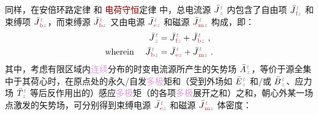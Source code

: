 同样，在安倍环路定律  和 \textcolor{Maroon}{电荷守恒}定律  中，总电流源 $\bar{J}^{\;\!\mathcolor{gray}{t}}_{\;\!\mathcolor{gray}{z}}$ 内包含了自由项 $\bar{J}^{\;\!\mathcolor{gray}{t}}_{\;\!\textcolor{Maroon}{\text{f}}\mathcolor{gray}{z}}$ 和束缚项 $\bar{J}^{\;\!\mathcolor{gray}{t}}_{\;\!\textcolor{Maroon}{\text{b}}\mathcolor{gray}{z}}$\cite{langeMultipoleTheoryHehl2015,raabMultipoleTheoryElectromagnetism2004}，而束缚源 $\bar{J}^{\;\!\mathcolor{gray}{t}}_{\;\!\textcolor{Maroon}{\text{b}}\mathcolor{gray}{z}}$ 又由电源 $\bar{J}^{\;\!\mathcolor{gray}{t}}_{\;\!\textcolor{Maroon}{\text{e}}\mathcolor{gray}{z}}$ 和磁源 $\bar{J}^{\;\!\mathcolor{gray}{t}}_{\;\!\textcolor{Maroon}{\text{m}}\mathcolor{gray}{z}}$ 构成，即：
\begin{subequations} \label{eq:j-fbem}
	\abovedisplayskip=2pt
	\belowdisplayskip=10pt
\begin{align}
	\bar{J}^{\;\!\mathcolor{gray}{t}}_{\;\!\mathcolor{gray}{z}} &= \bar{J}^{\;\!\mathcolor{gray}{t}}_{\;\!\textcolor{Maroon}{\text{f}}\mathcolor{gray}{z}} + \bar{J}^{\;\!\mathcolor{gray}{t}}_{\;\!\textcolor{Maroon}{\text{b}}\mathcolor{gray}{z}}~, \label{eq:j=f+b} \\ \text{wherein}~~~~ \bar{J}^{\;\!\mathcolor{gray}{t}}_{\;\!\textcolor{Maroon}{\text{b}}\mathcolor{gray}{z}} &= \bar{J}^{\;\!\mathcolor{gray}{t}}_{\;\!\textcolor{Maroon}{\text{e}}\mathcolor{gray}{z}} + \bar{J}^{\;\!\mathcolor{gray}{t}}_{\;\!\textcolor{Maroon}{\text{m}}\mathcolor{gray}{z}}~. \label{eq:b=e+m}
\end{align}
\end{subequations}
其中，考虑有限区域内\textcolor{Plum}{连续}分布的时变电流源所产生的矢势场 $\bar{A}^{\;\!\mathcolor{gray}{t}}_{\;\!\mathcolor{gray}{z}}$，等价于源全集中于其荷心时，在原点处的永久/自发\textcolor{Plum}{多极}矩和（受到外场如 $\bar{E}^{\;\!\mathcolor{gray}{t}}_{\;\!\mathcolor{gray}{z}}$ 和/或 $\bar{B}^{\;\!\mathcolor{gray}{t}}_{\;\!\mathcolor{gray}{z}}$、应力场 $\bar{T}^{\;\!\mathcolor{gray}{t}}_{\;\!\mathcolor{gray}{z}}$ 等后反作用出的）感应\textcolor{Plum}{多极}矩（的各项\textcolor{Plum}{多极}展开之和）之和，朝心外某一场点激发的矢势场\cite{raabMultipoleTheoryElectromagnetism2004,delangeTranslationalInvariancePost2012,chen-zhuChenZhuxieUndergraduate_courses2024}，可分别得到束缚电源 $\bar{J}^{\;\!\mathcolor{gray}{t}}_{\;\!\textcolor{Maroon}{\text{e}}\mathcolor{gray}{z}}$ 和磁源 $\bar{J}^{\;\!\mathcolor{gray}{t}}_{\;\!\textcolor{Maroon}{\text{m}}\mathcolor{gray}{z}}$ 体密度：
